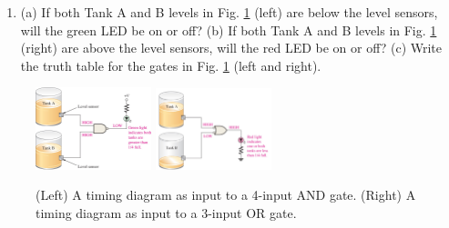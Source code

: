 \documentclass{article}
\begin{document}
\begin{enumerate}
\item (a) If both Tank A and B levels in Fig. \ref{fig:tanks} (left) are below the level sensors, will the green LED be on or off? (b) If both Tank A and B levels in Fig. \ref{fig:tanks} (right) are above the level sensors, will the red LED be on or off? (c) Write the truth table for the gates in Fig. \ref{fig:tanks} (left and right).
\end{enumerate}

\begin{figure}[hb]
\centering
\includegraphics[width=0.3\textwidth]{figures/tank_nand_1.jpg} \hspace{0.5cm}
\includegraphics[width=0.3\textwidth]{figures/tank_nand_2.jpg}
\caption{\label{fig:tanks} (Left) A timing diagram as input to a 4-input AND gate. (Right) A timing diagram as input to a 3-input OR gate.}
\end{figure}
\end{document}
